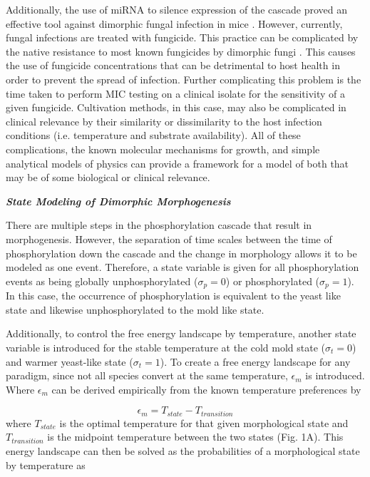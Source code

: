 \documentclass[preprint,12pt]{elsarticle}
\begin{document}
Additionally, the use of miRNA to silence expression of the cascade proved an effective tool against dimorphic fungal infection in mice \citep{Nemecek2006-ff}.  However, currently, fungal infections are treated with fungicide. This practice can be complicated by the native resistance to most known fungicides by dimorphic fungi \citep{Goughenour2017-xk}. This causes the use of fungicide concentrations that can be detrimental to host health in order to prevent the spread of infection. Further complicating this problem is the time taken to perform MIC testing on a clinical isolate for the sensitivity of a given fungicide. Cultivation methods, in this case, may also be complicated in clinical relevance by their similarity or dissimilarity to the host infection conditions (i.e. temperature and substrate availability). All of these complications, the known molecular mechanisms for growth, and simple analytical models of physics can provide a framework for a model of both that may be of some biological or clinical relevance. \\ \par


\textbf{\textit{State Modeling of Dimorphic Morphogenesis}}
\newline

There are multiple steps in the phosphorylation cascade that result in morphogenesis. However, the separation of time scales between the time of phosphorylation down the cascade and the change in morphology allows it to be modeled as one event. Therefore, a state variable is given for all phosphorylation events as being globally unphosphorylated ($\sigma_{p}=0$) or phosphorylated ($\sigma_{p}=1$). In this case, the occurrence of phosphorylation is equivalent to the yeast like state and likewise unphosphorylated to the mold like state. \\ \par

Additionally, to control the free energy landscape by temperature, another state variable is introduced for the stable temperature at the cold mold state ($\sigma_{t}=0$) and warmer yeast-like state ($\sigma_{t}=1$). To create a free energy landscape for any paradigm, since not all species convert at the same temperature, $\epsilon_{m}$ is introduced.  Where $\epsilon_{m}$ can be derived empirically from the known temperature preferences by

\begin{equation}
\epsilon_{m} = T_{state} - T_{transition}
\end{equation}
%
where  $T_{state}$ is the optimal temperature for that given morphological state and $T_{transition}$ is the midpoint temperature between the two states (Fig. 1A). This energy landscape can then be solved as the probabilities of a morphological state by temperature as
\end{document}
